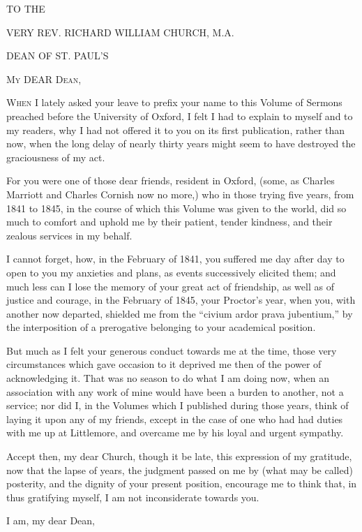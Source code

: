 



TO THE

VERY REV. RICHARD WILLIAM CHURCH, M.A.

DEAN OF ST. PAUL'S


M\textsc{y} DEAR D\textsc{ean},

W\textsc{hen} I lately asked your leave to prefix your name to this Volume of
Sermons preached before the University of Oxford, I felt I had to
explain to myself and to my readers, why I had not offered it to you
on its first publication, rather than now, when the long delay of
nearly thirty years might seem to have destroyed the graciousness of
my act.


For you were one of those dear friends, resident in Oxford, (some,
as Charles Marriott and Charles Cornish now no more,) who in those
trying five years, from 1841 to 1845, in the course of which this
Volume was given to the world, did so much to comfort and uphold me by
their patient, tender kindness, and their zealous services in my
behalf.


I cannot forget, how, in the February of 1841, you suffered me day
after day to open to you my anxieties and plans, as events
successively elicited them; and much less can I lose the memory of
your great act of friendship, as well as of justice and courage, in
the February of 1845, your Proctor's year, when you, with another now
departed, shielded me from the ``civium ardor prava jubentium,''
by the interposition of a prerogative belonging to your academical
position.


But much as I felt your generous conduct towards me at the time,
those very circumstances which gave occasion to it deprived me then of
the power of acknowledging it. That was no season to do what I am
doing now, when an association with any work of mine would have been a
burden to another, not a service; nor did I, in the Volumes which I
published during those years, think of laying it upon any of my
friends, except in the case of one who had had duties with me up at
Littlemore, and overcame me by his loyal and urgent sympathy.


Accept then, my dear Church, though it be late, this expression of
my gratitude, now that the lapse of years, the judgment passed on me
by (what may be called) posterity, and the dignity of your present
position, encourage me to think that, in thus gratifying myself, I am
not inconsiderate towards you.


I am, my dear Dean,

